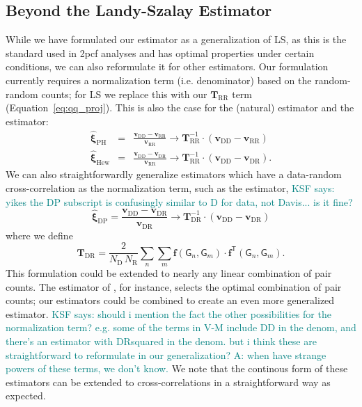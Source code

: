 \documentclass[modern]{aastex62}
\newcommand{\cf}{2pcf\xspace} %
\newcommand{\LS}{LS\xspace}
\newcommand{\inv}{^{-1}}
\newcommand{\T}{^{\mathsf{T}}}
\newcommand{\bld}[1]{\bm{#1}} %
\newcommand{\vv}[1]{\bld{v}_\mathrm{#1}}
\newcommand{\TT}[1]{\bld{T}_\mathrm{#1}}
\newcommand{\ff}{\bld{f}}
\newcommand{\NN}[1]{N_\mathrm{#1}}
\newcommand{\GG}[1]{\mathsf{G}_{#1}}
\newcommand{\KSF}[1]{\textcolor{teal}{KSF says: #1}}
\begin{document}
\label{ref:beyondls}
\subsection{Beyond the Landy-Szalay Estimator}

While we have formulated our estimator as a generalization of \LS, as this is the standard used in \cf analyses and has optimal properties under certain conditions, we can also reformulate it for other estimators.
Our formulation currently requires a normalization term (i.e. denominator) based on the random-random counts; for \LS we replace this with our $\TT{RR}$ term (Equation~\ref{eq:qq_proj}).
This is also the case for the \cite{PeeblesHauser1974} (natural) estimator and the \cite{Hewett1982} estimator:
\begin{eqnarray}
    \bld{\hat{\xi}}_\mathrm{PH} &=& \frac{\vv{DD} - \vv{RR}}{\vv{RR}} \rightarrow \TT{RR}\inv \cdot \left( \vv{DD} - \vv{RR} \right)\\
    \bld{\hat{\xi}}_\mathrm{Hew} &=& \frac{\vv{DD} - \vv{DR}}{\vv{RR}} \rightarrow \TT{RR}\inv \cdot \left( \vv{DD} - \vv{DR} \right).
\end{eqnarray}
We can also straightforwardly generalize estimators which have a data-random cross-correlation as the normalization term, such as the \cite{DavisPeebles1983} estimator,
\KSF{yikes the DP subscript is confusingly similar to D for data, not Davis... is it fine?}
\begin{equation}
    \bld{\hat{\xi}}_\mathrm{DP} = \frac{\vv{DD} - \vv{DR}}{\vv{DR}} \rightarrow \TT{DR}\inv \cdot \left( \vv{DD} - \vv{DR} \right)
\end{equation}
where we define
\begin{equation}
    \TT{DR} = \frac{2}{\NN{D}\,\NN{R}} \sum_{n} \sum_{m} \ff(\GG{n}, \GG{m}) \cdot \ff\T(\GG{n}, \GG{m}).
\end{equation}
This formulation could be extended to nearly any linear combination of pair counts.
The estimator of \cite{VargasMagana2013}, for instance, selects the optimal combination of pair counts; our estimators could be combined to create an even more generalized estimator.
\KSF{should i mention the fact the other possibilities for the normalization term? e.g. some of the terms in V-M include DD in the denom, and there's an estimator with DRsquared in the denom. but i think these are straightforward to reformulate in our generalization? A: when have strange powers of these terms, we don't know.}
We note that the continous form of these estimators can be extended to cross-correlations in a straightforward way as expected.
\end{document}
